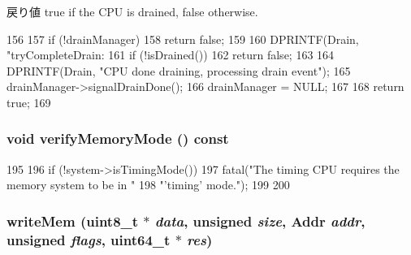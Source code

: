 \begin{DoxyReturn}{戻り値}
true if the CPU is drained, false otherwise. 
\end{DoxyReturn}



\begin{DoxyCode}
156 {
157     if (!drainManager)
158         return false;
159 
160     DPRINTF(Drain, "tryCompleteDrain: %
161     if (!isDrained())
162         return false;
163 
164     DPRINTF(Drain, "CPU done draining, processing drain event\n");
165     drainManager->signalDrainDone();
166     drainManager = NULL;
167 
168     return true;
169 }
\end{DoxyCode}
\hypertarget{classTimingSimpleCPU_ae2e1ccebe596a180f8105d57f9a93645}{
\subsubsection[{verifyMemoryMode}]{\setlength{\rightskip}{0pt plus 5cm}void verifyMemoryMode () const}}
\label{classTimingSimpleCPU_ae2e1ccebe596a180f8105d57f9a93645}



\begin{DoxyCode}
195 {
196     if (!system->isTimingMode()) {
197         fatal("The timing CPU requires the memory system to be in "
198               "'timing' mode.\n");
199     }
200 }
\end{DoxyCode}
\hypertarget{classTimingSimpleCPU_ad46c5edeb1ee9b60445f3e26364e2c5e}{
\subsubsection[{writeMem}]{ writeMem (uint8\_\-t $\ast$ {\em data}, \/  unsigned {\em size}, \/  {\bf Addr} {\em addr}, \/  unsigned {\em flags}, \/  uint64\_\-t $\ast$ {\em res})}}
\label{classTimingSimpleCPU_ad46c5edeb1ee9b60445f3e26364e2c5e}



